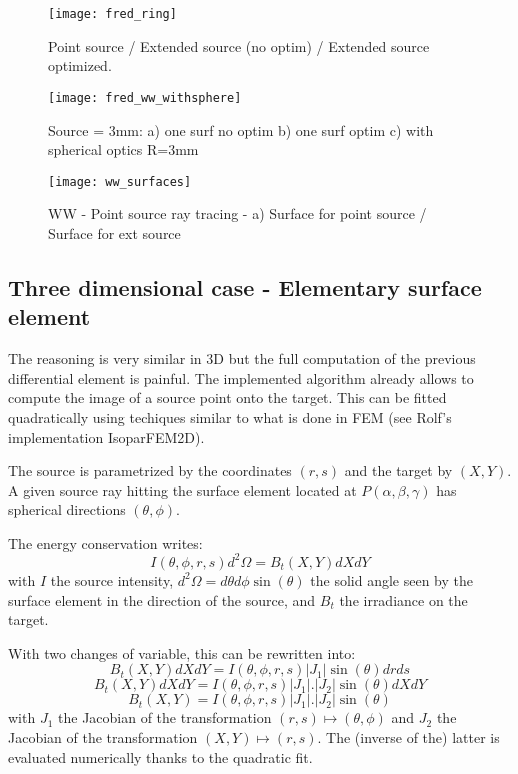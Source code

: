 \begin{figure}[!htbp]
\centering
\texttt{[image: fred\_ring]} 
\caption{Point source / Extended source (no optim) / Extended source optimized. }
\label{fig:res_fred_ring}
\end{figure}

\begin{figure}[!htbp]
\centering
\texttt{[image: fred\_ww\_withsphere]} 
\caption{ Source = 3mm: a) one surf no optim b) one surf optim c) with spherical optics R=3mm}
\label{fig:res_fred_ww_sphere}
\end{figure}

\begin{figure}[!htbp]
\centering
\texttt{[image: ww\_surfaces]} 
\caption{WW - Point source ray tracing - a) Surface for point source / Surface for ext source}
\label{fig:res_ww_surfaces}
\end{figure}

\subsection{Three dimensional case - Elementary surface element }
The reasoning is very similar in 3D but the full computation
of the previous differential element is painful.
The implemented algorithm already allows to compute
the image of a source point onto the target.
This can be fitted quadratically using techiques similar to what
is done in FEM (see Rolf's implementation IsoparFEM2D).

The source is parametrized by the coordinates $(r, s)$ and
the target by $(X, Y)$. A given source ray hitting the surface
element located at $P(\alpha, \beta, \gamma)$ has spherical 
directions $(\theta, \phi)$.

The energy conservation writes:
\[ I(\theta, \phi, r, s)d^2\Omega = B_t(X, Y)dXdY\]
with $I$ the source intensity, $d^2\Omega = d\theta d\phi\sin(\theta)$
 the solid angle 
seen by the surface element in the direction of 
the source, and $B_t$ the irradiance
on the target.

With two changes of variable, this can be rewritten into:
\[ B_t(X, Y)dXdY = I(\theta, \phi, r, s)|J_1| 
\sin(\theta) dr ds  \]
\[ B_t(X, Y)dXdY = I(\theta, \phi, r, s)|J_1|. |J_2| \sin(\theta) dX dY\]
\[ B_t(X, Y) = I(\theta, \phi, r, s)|J_1|. |J_2| \sin(\theta)\]
with $J_1$ the Jacobian of the transformation 
$(r, s) \mapsto (\theta, \phi)$ and $J_2$ the Jacobian of the 
transformation $(X, Y) \mapsto (r, s)$. The (inverse of the) 
latter is evaluated
numerically thanks to the quadratic fit.


